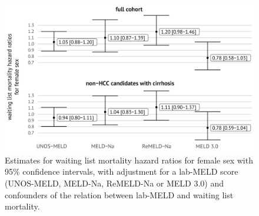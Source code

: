 \documentclass[11pt,twoside,]{book}
\begin{document}
\begin{figure}[ht]

{\centering \includegraphics[width=1\linewidth]{figures/ch4/fig6_hr_mrt} 

}

\caption{Estimates for waiting list mortality hazard ratios for female sex with 95\% confidence intervals, with adjustment for a lab-MELD score (UNOS-MELD, MELD-Na, ReMELD-Na or MELD 3.0) and confounders of the relation between lab-MELD and waiting list mortality.}\label{fig:ch4fig6}
\end{figure}

\begingroup
\setlength{\aboverulesep}{0.2ex}
\setlength{\belowrulesep}{0.3ex}
\end{document}

